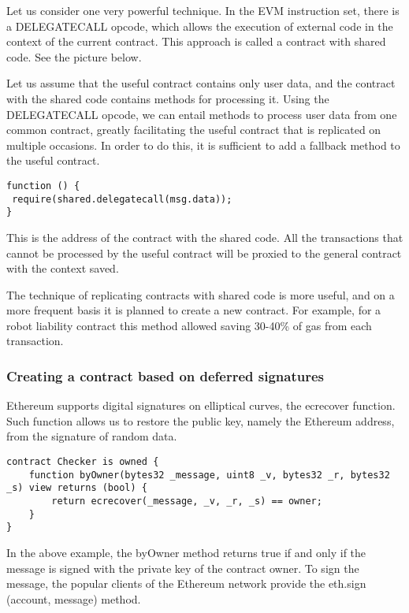 \documentclass{article}
\begin{document}
Let us consider one very powerful technique. In the EVM instruction set, there is a DELEGATECALL opcode, which allows the execution of external code in the context of the current contract. This approach is called a contract with shared code. See the picture below.

Let us assume that the useful contract contains only user data, and the contract with the shared code contains methods for processing it. Using the DELEGATECALL opcode, we can entail methods to process user data from one common contract, greatly facilitating the useful contract that is replicated on multiple occasions. In order to do this, it is sufficient to add a fallback method to the useful contract.

\begin{lstlisting}
function () {
 require(shared.delegatecall(msg.data));
}
\end{lstlisting}

This is the address of the contract with the shared code. All the transactions that cannot be processed by the useful contract will be proxied to the general contract with the context saved.

The technique of replicating contracts with shared code is more useful, and on a more frequent basis it is planned to create a new contract. For example, for a robot liability contract this method allowed saving 30-40\% of gas from each transaction.

\subsubsection{Creating a contract based on deferred signatures}

Ethereum supports digital signatures on elliptical curves, the ecrecover function. Such function allows us to restore the public key, namely the Ethereum address, from the signature of random data.

\begin{lstlisting}
contract Checker is owned {
    function byOwner(bytes32 _message, uint8 _v, bytes32 _r, bytes32 _s) view returns (bool) {
        return ecrecover(_message, _v, _r, _s) == owner;
    }
}
\end{lstlisting}

In the above example, the byOwner method returns true if and only if the message is signed with the private key of the contract owner. To sign the message, the popular clients of the Ethereum network provide the eth.sign (account, message) method.
\end{document}
